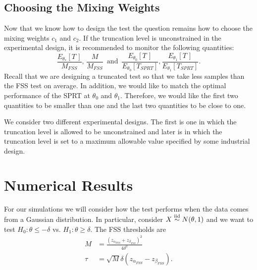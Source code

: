 \documentclass[11pt]{article}
\begin{document}
\subsection{Choosing the Mixing Weights}

Now that we know how to design the test the question remains how to choose the mixing weights $c_1$ and $c_2$. If the truncation level is unconstrained in the experimental design, it is recommended to monitor the following quantities:
\begin{equation}\label{eq:c_optim}
\frac{E_{\theta_{*}}[T\,]}{M_{FSS}}, \, \frac{M}{M_{FSS}}  \, \text{ and } \, \frac{E_{\theta_0}[T\,]}{E_{\theta_0}[T_{SPRT}]}, \frac{E_{\theta_1}[T\,]}{E_{\theta_1}[T_{SPRT}]}.
\end{equation}
Recall that we are designing a truncated test so that we take less samples than the FSS test on average. In addition, we would like to match the optimal performance of the SPRT at $\theta_0$ and $\theta_1$. Therefore, we would like the first two quantities to be smaller than one and the last two quantities to be close to one.

We consider two different experimental designs. The first is one in which the truncation level is allowed to be unconstrained and later is in which the truncation level is set to a maximum allowable value specified by some industrial design. 


\section{Numerical Results}

For our simulations we will consider how the test performs when the data comes from a Gaussian distribution. In particular, consider $X \overset{\text{iid}}\sim N(\theta, 1)$ and we want to test $H_0 : \theta \leq -\delta$ vs. $H_1 : \theta \geq \delta$. The FSS thresholds are
\begin{equation}
\begin{split}
M &= \frac{(z_{\alpha_{FSS}} + z_{\beta_{FSS}})^2}{4 \delta^2} \\
\tau &= \sqrt{M} \delta (z_{\alpha_{FSS}} - z_{\beta_{FSS}}).
\end{split}
\end{equation}
\end{document}
